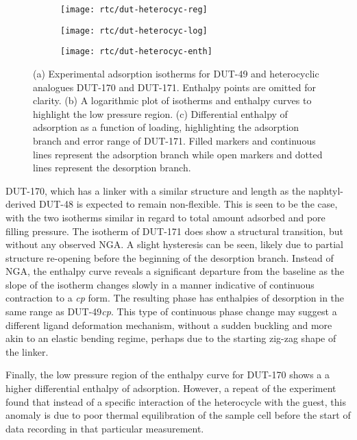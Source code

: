 \begin{figure}[htb]
    \centering
    \begin{subfigure}{0.33\linewidth}
        \texttt{[image: rtc/dut-heterocyc-reg]}%
        \caption{}\label{dut:fig:dut-heterocyc-reg}
    \end{subfigure}%
    \begin{subfigure}{0.33\linewidth}
        \texttt{[image: rtc/dut-heterocyc-log]}%
        \caption{}\label{dut:fig:dut-heterocyc-log}
    \end{subfigure}%
    \begin{subfigure}{0.33\linewidth}
        \texttt{[image: rtc/dut-heterocyc-enth]}%
        \caption{}\label{dut:fig:dut-heterocyc-enth}
    \end{subfigure}%
    \caption{(a) Experimental adsorption isotherms for DUT-49 and 
    heterocyclic analogues DUT-170 and DUT-171. 
    Enthalpy points are omitted for clarity. 
    (b) A logarithmic plot of isotherms and enthalpy curves
    to highlight the low pressure region. 
    (c) Differential enthalpy of adsorption as a function of loading, highlighting the 
    adsorption branch and error range of DUT-171.
    Filled markers and continuous lines represent the adsorption 
    branch while open markers and dotted lines represent the 
    desorption branch.
    }\label{dut:fig:dut-heterocyc}
\end{figure}

DUT-170, which has a linker with a similar structure and length as
the naphtyl-derived DUT-48 is expected to remain non-flexible.
This is seen to be the case, with the two isotherms similar in 
regard to total amount adsorbed and pore filling pressure. 
The isotherm of DUT-171 does show a structural transition, 
but without any observed \gls{NGA}. A slight hysteresis can be seen,
likely due to partial structure re-opening before the beginning 
of the desorption branch. Instead of \gls{NGA}, the enthalpy curve 
reveals a significant departure from the baseline as the 
slope of the isotherm changes slowly in a manner indicative
of continuous contraction to a \textit{cp} form. The resulting phase 
has enthalpies of desorption in the same range as DUT-49\textit{cp}.
This type of continuous phase change may suggest a different 
ligand deformation mechanism, without a sudden buckling and 
more akin to an elastic bending regime, perhaps due to the 
starting zig-zag shape of the linker.

Finally, the low pressure region of the enthalpy curve for 
DUT-170 shows a a higher differential enthalpy of adsorption.
However, a repeat of the experiment found that instead of 
a specific interaction of the heterocycle with the guest,
this anomaly is due to poor thermal equilibration of the 
sample cell before the start of data recording in that 
particular measurement.

